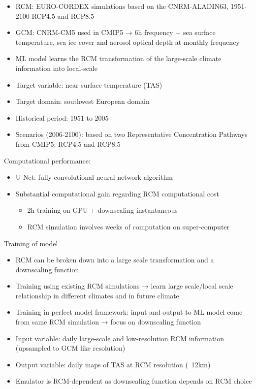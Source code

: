 \documentclass[a4paper,11pt,oneside]{report}
\begin{document}
\begin{itemize}
\item RCM: EURO-CORDEX simulations based on the CNRM-ALADIN63, 1951-2100 RCP4.5 and RCP8.5
\item GCM: CNRM-CM5 used in CMIP5 → 6h frequency + sea surface temperature, sea ice cover and aerosol optical depth at monthly frequency
\item ML model learns the RCM transformation of the large-scale climate information into local-scale
\item Target variable: near surface temperature (TAS)
\item Target domain: southwest European domain
\item Historical period: 1951 to 2005
\item Scenarios (2006-2100): based on two Representative Concentration Pathways from CMIP5; RCP4.5 and RCP8.5
\end{itemize}
Computational performance:
\begin{itemize}
    \item U-Net: fully convolutional neural network algorithm
    \item Substantial computational gain regarding RCM computational cost
    \begin{itemize}
        \item 2h training on GPU + downscaling instantaneous
        \item RCM simulation involves weeks of computation on super-computer
    \end{itemize}
\end{itemize}
Training of model 
\begin{itemize}
    \item RCM can be broken down into a large scale transformation and a downscaling function
    \item Training using existing RCM simulations → learn large scale/local scale relationship in different climates and in future climate
    \item Training in perfect model framework: input and output to ML model come from same RCM simulation → focus on downscaling function
    \item Input variable: daily large-scale and low-resolution RCM information (upsampled to GCM like resolution)
    \item Output variable: daily maps of TAS at RCM resolution (~12km)
    \item Emulator is RCM-dependent as downscaling function depends on RCM choice
\end{itemize}
\end{document}
